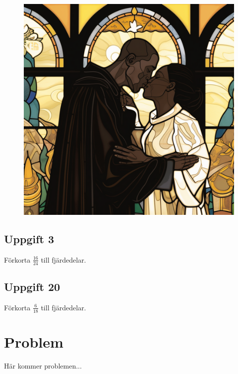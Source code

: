 \documentclass[twocolumn]{article}
\begin{document}
\begin{figure}[htp]
\centering
\includegraphics[width=0.75\linewidth]{2.png}
\end{figure}

\subsection*{\centering Uppgift 3}
{\large Förkorta $\frac{16}{24}$ till fjärdedelar.}

\subsection*{\centering Uppgift 20}
{\large Förkorta $\frac{6}{18}$ till fjärdedelar.}

\section{Problem}

\large Här kommer problemen...
\end{document}
